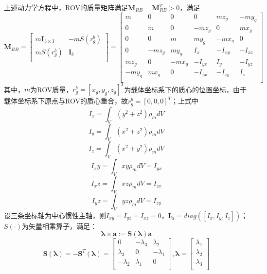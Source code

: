 上述动力学方程中，ROV的质量矩阵满足$\symbf{M}_{RB}=\symbf{M}_{RB}^T>0$，满足
\begin{equation}
    \symbf{M}_{RB}=\begin{bmatrix}
        m\symbf{I}_{3\times 3} & -mS(r_g^b) \\
        mS(r_g^b) & \symbf{I}_b \\
    \end{bmatrix} = \begin{bmatrix}
        m & 0 & 0 & 0 & mz_g & -my_g \\
        0 & m & 0 & -mz_g & 0 & mx_g \\
        0 & 0 & m & my_g & -mx_g & 0 \\
        0 & -mz_g & my_g & I_x & -I_{xy} & -I_{xz} \\
        mz_g & 0 & -mx_g & -I_{yx} & I_y & -I_{yz} \\
        -my_g & mx_g & 0 & -I_{zx} & -I_{zy} & I_z \\
    \end{bmatrix}
\end{equation}
其中，$m$为ROV质量，$r_g^b = [x_g,y_g,z_g]^T$为载体坐标系下的质心的位置坐标，由于载体坐标系下原点与ROV的质心重合，故$r_g^b=[0,0,0]^T$；上式中
 $$I_x = \int_V(y^2+z^2)\rho_mdV$$
 $$I_y = \int_V(x^2+z^2)\rho_mdV$$
 $$I_z = \int_V(x^2+y^2)\rho_mdV$$
 $$I_xy = \int_Vxy\rho_mdV=I_{yx}$$
 $$I_xz = \int_Vxz\rho_mdV=I_{zx}$$
\begin{equation}
 I_yz = \int_Vyz\rho_mdV=I_{zy}
\end{equation}
设三条坐标轴为中心惯性主轴，则$I_{xy} = I_{yz} = I_{xz} = 0$，$\symbf{I_b} = diag([I_x, I_y, I_z])$；$S(\cdot)$为矢量相乘算子，满足：
$$\symbf{\lambda}\times \symbf{a}:=\symbf{S}(\symbf{\lambda})\symbf{a}$$
\begin{equation}
    \symbf{S}(\symbf{\lambda})=-\symbf{S}^T(\symbf{\lambda})=\left[
    \begin{matrix}
    0 & -\lambda_3 & \lambda_2 \\
    \lambda_3 & 0 & -\lambda_1 \\
    -\lambda_2 & \lambda_1 & 0 \\
    \end{matrix}
    \right], \symbf{\lambda}=\left[
    \begin{matrix}
    \lambda_1 \\
    \lambda_2 \\
    \lambda_3 \\
    \end{matrix}
    \right]
\end{equation}
